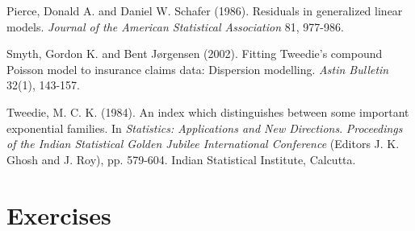 \begin{multicols}{2}
Pierce, Donald A. and Daniel W. Schafer (1986). Residuals in
generalized linear models. \emph{Journal of the American Statistical
Association} 81, 977-986.

Smyth, Gordon K. and Bent J{\o}rgensen (2002). Fitting Tweedie's
compound Poisson model to insurance claims data: Dispersion
modelling. \emph{Astin Bulletin} 32(1), 143-157.

Tweedie, M. C. K. (1984). An index which distinguishes between some
important exponential families. In \emph{Statistics: Applications
and New Directions}. \emph{Proceedings of the Indian Statistical
Golden Jubilee International Conference} (Editors J. K. Ghosh and J.
Roy), pp. 579-604. Indian Statistical Institute, Calcutta.


\end{multicols}


\section{Exercises}

